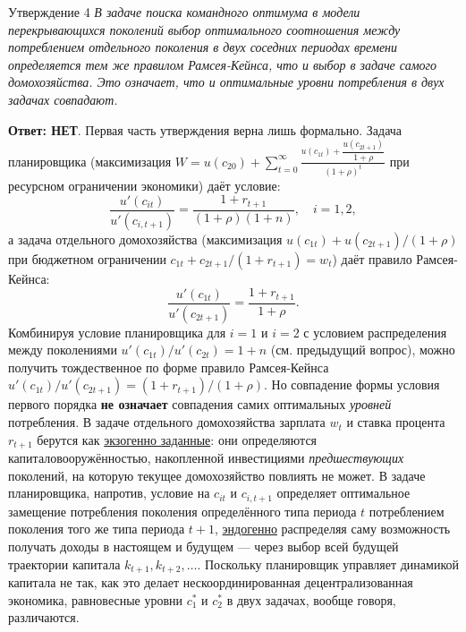 \documentclass[10pt,a4paper]{article}
\newcommand{\qnet}{\textbf{\color{nored}Ответ: НЕТ}}
\newenvironment{answer}[2]{%
  \begin{qbox}{Утверждение #1}
  \textit{#2}\par\smallskip
}{%
  \end{qbox}\vspace{2pt}
}
\begin{document}
\begin{answer}{4}{В задаче поиска командного оптимума в модели перекрывающихся поколений выбор оптимального соотношения между потреблением отдельного поколения в двух соседних периодах времени определяется тем же правилом Рамсея-Кейнса, что и выбор в задаче самого домохозяйства. Это означает, что и оптимальные уровни потребления в двух задачах совпадают.}
\qnet. Первая часть утверждения верна лишь формально. Задача планировщика (максимизация $W = u(c_{20}) + \sum_{t=0}^{\infty}\frac{u(c_{1t})+\dfrac{u(c_{2t+1})}{1+\rho}}{(1+\rho)^{t}}$ при ресурсном ограничении экономики) даёт условие:
\[
\frac{u'(c_{it})}{u'(c_{i,t+1})} = \frac{1+r_{t+1}}{(1+\rho)(1+n)},\quad i=1,2,
\]
а задача отдельного домохозяйства (максимизация $u(c_{1t})+u(c_{2t+1})/(1+\rho)$ при бюджетном ограничении $c_{1t}+c_{2t+1}/(1+r_{t+1})=w_t$) даёт правило Рамсея-Кейнса:
\[
\frac{u'(c_{1t})}{u'(c_{2t+1})} = \frac{1+r_{t+1}}{1+\rho}.
\]
Комбинируя условие планировщика для $i=1$ и $i=2$ с условием распределения между поколениями $u'(c_{1t})/u'(c_{2t})=1+n$ (см. предыдущий вопрос), можно получить тождественное по форме правило Рамсея-Кейнса $u'(c_{1t})/u'(c_{2t+1})=(1+r_{t+1})/(1+\rho)$. Но совпадение формы условия первого порядка \textbf{не означает} совпадения самих оптимальных \emph{уровней} потребления. В задаче отдельного домохозяйства зарплата $w_t$ и ставка процента $r_{t+1}$ берутся как \underline{экзогенно заданные}: они определяются капиталовооружённостью, накопленной инвестициями \emph{предшествующих} поколений, на которую текущее домохозяйство повлиять не может. В задаче планировщика, напротив, условие на $c_{it}$ и $c_{i,t+1}$ определяет оптимальное замещение потребления поколения определённого типа периода $t$ потреблением поколения того же типа периода $t+1$, \underline{эндогенно} распределяя саму возможность получать доходы в настоящем и будущем — через выбор всей будущей траектории капитала $k_{t+1},k_{t+2},\dots$. Поскольку планировщик управляет динамикой капитала не так, как это делает нескоординированная децентрализованная экономика, равновесные уровни $c_1^{*}$ и $c_2^{*}$ в двух задачах, вообще говоря, различаются.
\end{answer}
 
\end{document}

